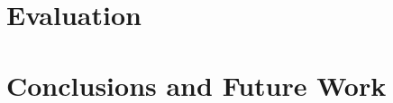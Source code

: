 \documentclass{llncs}
\begin{document}


\section{Evaluation}




\section{Conclusions and Future Work}




%
%
%
%
%
%
%
\clearpage
%
\end{document}
